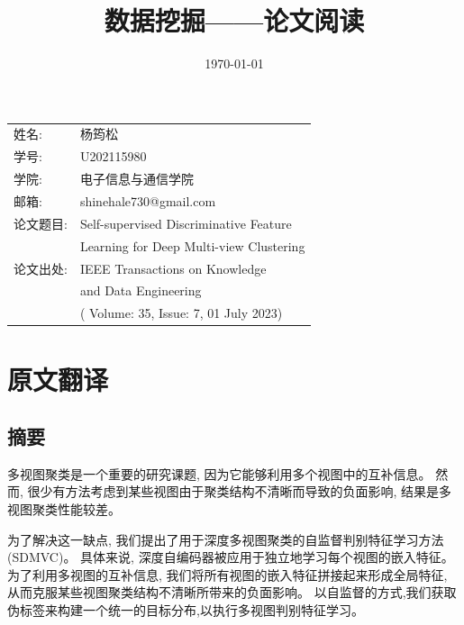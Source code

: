 \documentclass{article}
\begin{document}
\title{\Huge 数据挖掘——论文阅读}
\date{\today}

\maketitle

\begin{center}
    \begin{tabular}{ll}
        姓名:   & 杨筠松                                    \\
        学号:   & U202115980                             \\
        学院:   & 电子信息与通信学院                              \\
        邮箱:   & shinehale730@gmail.com                 \\
        论文题目: & Self-supervised Discriminative Feature
        \\ & Learning for Deep Multi-view Clustering \\
        论文出处: & IEEE Transactions on Knowledge         \\
              & and Data Engineering                   \\
              & ( Volume: 35, Issue: 7, 01 July 2023)
    \end{tabular}
\end{center}

\newpage

\tableofcontents

\newpage

\section{原文翻译}

\subsection{摘要}

多视图聚类是一个重要的研究课题, 因为它能够利用多个视图中的互补信息。
然而, 很少有方法考虑到某些视图由于聚类结构不清晰而导致的负面影响, 结果是多视图聚类性能较差。

为了解决这一缺点, 我们提出了用于深度多视图聚类的自监督判别特征学习方法(SDMVC)。
具体来说, 深度自编码器被应用于独立地学习每个视图的嵌入特征。
为了利用多视图的互补信息, 我们将所有视图的嵌入特征拼接起来形成全局特征, 从而克服某些视图聚类结构不清晰所带来的负面影响。
以自监督的方式,我们获取伪标签来构建一个统一的目标分布,以执行多视图判别特征学习。
\end{document}
